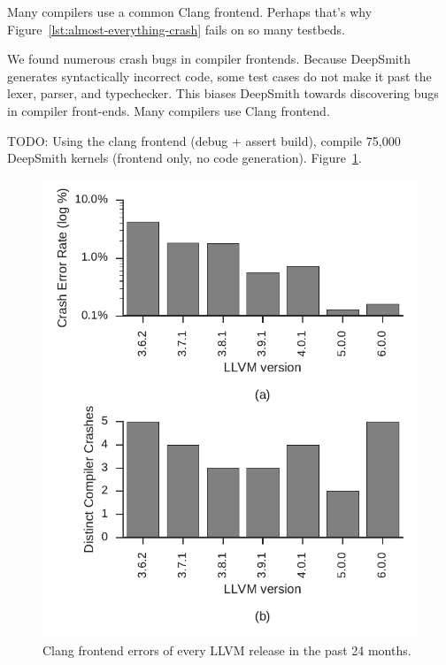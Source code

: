 Many compilers use a common Clang frontend. Perhaps that's why Figure~\ref{lst:almost-everything-crash} fails on so many testbeds.

We found numerous crash bugs in compiler frontends. Because DeepSmith generates syntactically incorrect code, some test cases do not make it past the lexer, parser, and typechecker. This biases DeepSmith towards discovering bugs in compiler front-ends. Many compilers use Clang frontend.

TODO: Using the clang frontend (debug + assert build), compile 75,000 DeepSmith kernels (frontend only, no code generation). Figure~\ref{fig:clangs}. 

\begin{figure}
  \centering %
  \includegraphics[width=.95\columnwidth]{build/img/clang-crashes}%
  \caption{%
    Clang frontend errors of every LLVM release in the past 24 months.%
  }%
  \label{fig:clangs} %
\end{figure}

